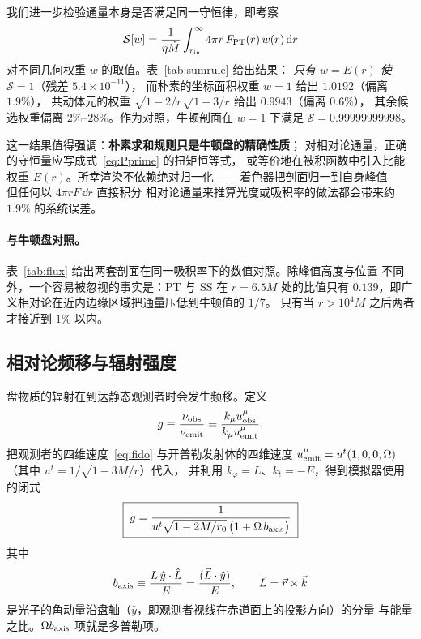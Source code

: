 我们进一步检验通量本身是否满足同一守恒律，即考察
\begin{equation}
\mathcal{S}[w]=\frac{1}{\eta\dot M}\int_{r_{\mathrm{in}}}^{\infty}
4\pi r\,F_{\rm PT}(r)\,w(r)\,\mathrm{d} r
\label{eq:weighted}
\end{equation}
对不同几何权重 $w$ 的取值。表~\ref{tab:sumrule} 给出结果：
\emph{只有 $w=E(r)$ 使 $\mathcal{S}=1$}（残差 $5.4\times10^{-11}$），
而朴素的坐标面积权重 $w=1$ 给出 $1.0192$（偏离 $1.9\%$），
共动体元的权重 $\sqrt{1-2/r}\sqrt{1-3/r}$ 给出 $0.9943$（偏离 $0.6\%$），
其余候选权重偏离 $2\%$--$28\%$。作为对照，牛顿剖面在 $w=1$ 下满足
$\mathcal{S}=0.99999999998$。

这一结果值得强调：\textbf{朴素求和规则只是牛顿盘的精确性质}；
对相对论通量，正确的守恒量应写成式~\eqref{eq:Pprime} 的扭矩恒等式，
或等价地在被积函数中引入比能权重 $E(r)$。所幸渲染不依赖绝对归一化——
着色器把剖面归一到自身峰值——但任何以 $4\pi rF\,\dd r$ 直接积分
相对论通量来推算光度或吸积率的做法都会带来约 $1.9\%$ 的系统误差。





\paragraph{与牛顿盘对照。}
表~\ref{tab:flux} 给出两套剖面在同一吸积率下的数值对照。除峰值高度与位置
不同外，一个容易被忽视的事实是：PT 与 SS 在 $r=6.5M$ 处的比值只有
$0.139$，即广义相对论在近内边缘区域把通量压低到牛顿值的 $1/7$。
只有当 $r>10^{4}M$ 之后两者才接近到 $1\%$ 以内。





\subsection{相对论频移与辐射强度}\label{sec:shift}

盘物质的辐射在到达静态观测者时会发生频移。定义
\begin{equation}
g\equiv\frac{\nu_{\rm obs}}{\nu_{\rm emit}}
=\frac{k_{\mu}u^{\mu}_{\rm obs}}{k_{\mu}u^{\mu}_{\rm emit}} .
\label{eq:gdef}
\end{equation}
把观测者的四维速度~\eqref{eq:fido} 与开普勒发射体的四维速度
$u^{\mu}_{\rm emit}=u^{t}(1,0,0,\Omega)$（其中 $u^{t}=1/\sqrt{1-3M/r}$）代入，
并利用 $k_{\varphi}=L$、$k_{t}=-E$，得到模拟器使用的闭式
\begin{equation}
\boxed{\;g=\frac{1}{u^{t}\sqrt{1-2M/r_{0}}\,\bigl(1+\Omega\,b_{\rm axis}\bigr)}\;}
\label{eq:g}
\end{equation}
其中
\begin{equation}
b_{\rm axis}\equiv\frac{L\,\hat y\cdot\hat L}{E}
=\frac{(\vec L\cdot\hat y)}{E},
\qquad \vec L=\vec r\times\vec k
\label{eq:baxis}
\end{equation}
是光子的角动量沿盘轴（$\hat y$，即观测者视线在赤道面上的投影方向）的分量
与能量之比。$\Omega b_{\rm axis}$ 项就是多普勒项。

